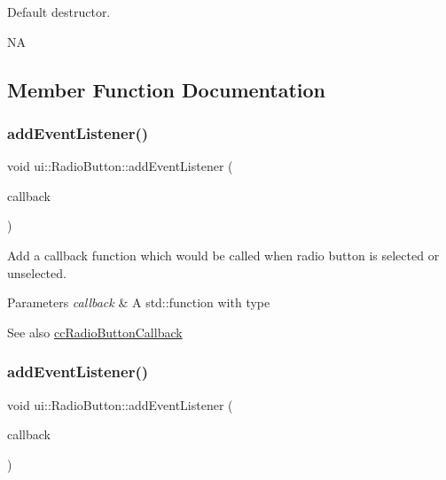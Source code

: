 Default destructor.

NA 

\subsection{Member Function Documentation}
\mbox{\label{classui_1_1RadioButton_aba218170ffc35b01b0b5f96d94f190af}} 
\subsubsection{\texorpdfstring{add\+Event\+Listener()}{addEventListener()}\hspace{0.1cm}{\footnotesize\ttfamily [1/2]}}
{\footnotesize\ttfamily void ui\+::\+Radio\+Button\+::add\+Event\+Listener (\begin{DoxyParamCaption}\item[{const \hyperlink{classui_1_1RadioButton_a14dd0e15b76ab9ce823593a677cb777f}{cc\+Radio\+Button\+Callback} \&}]{callback }\end{DoxyParamCaption})}

Add a callback function which would be called when radio button is selected or unselected. 
\begin{DoxyParams}{Parameters}
{\em callback} & A std\+::function with type \\
\hline
\end{DoxyParams}
\begin{DoxySeeAlso}{See also}
{\ttfamily \hyperlink{classui_1_1RadioButton_a14dd0e15b76ab9ce823593a677cb777f}{cc\+Radio\+Button\+Callback}} 
\end{DoxySeeAlso}
\mbox{\label{classui_1_1RadioButton_aba218170ffc35b01b0b5f96d94f190af}} 
\subsubsection{\texorpdfstring{add\+Event\+Listener()}{addEventListener()}\hspace{0.1cm}{\footnotesize\ttfamily [2/2]}}
{\footnotesize\ttfamily void ui\+::\+Radio\+Button\+::add\+Event\+Listener (\begin{DoxyParamCaption}\item[{const \hyperlink{classui_1_1RadioButton_a14dd0e15b76ab9ce823593a677cb777f}{cc\+Radio\+Button\+Callback} \&}]{callback }\end{DoxyParamCaption})}

